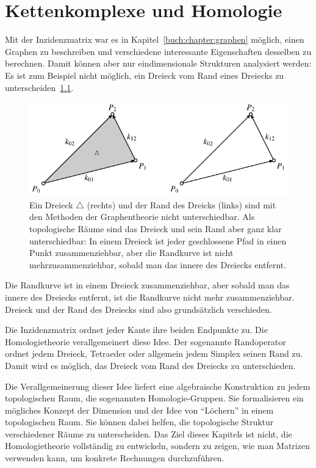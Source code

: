 %
%
%
\chapter{Kettenkomplexe und Homologie
\label{buch:chapter:homologie}}
\rhead{}
Mit der Inzidenzmatrix war es in Kapitel~\ref{buch:chapter:graphen}
möglich, einen Graphen zu beschreiben
und verschiedene interessante Eigenschaften desselben zu berechnen.
Damit können aber nur eindimensionale Strukturen analysiert werden:
Es ist zum Beispiel nicht möglich, ein Dreieck vom Rand eines
Dreiecks zu unterscheiden~\ref{buch:homologie:figure:zusammenziehbar}.
\begin{figure}
\centering
\includegraphics{chapters/95-homologie/images/dreieck.pdf}
\caption{Ein Dreieck $\triangle$ (rechts) und der Rand des Dreicks
(links) sind mit den Methoden
der Graphentheorie nicht unterschiedbar. 
Als topologische Räume sind das Dreieck und sein Rand aber ganz klar
unterschiedbar: In einem Dreieck ist jeder geschlossene Pfad in einen 
Punkt zusammenziehbar, aber die Randkurve ist nicht mehrzusammenziehbar,
sobald man das innere des Dreiecks entfernt.
\label{buch:homologie:figure:zusammenziehbar}}
\end{figure}
Die Randkurve ist in einem Dreieck zusammenziehbar, aber sobald man
das innere des Dreiecks entfernt, ist die Randkurve nicht mehr
zusammenziehbar.
Dreieck und der Rand des Dreiecks sind also grundsätzlich verschieden.

Die Inzidenzmatrix ordnet jeder Kante ihre beiden Endpunkte zu.
Die Homologietheorie verallgemeinert diese Idee.
Der sogenannte Randoperator ordnet jedem Dreieck, Tetraeder oder allgemein
jedem Simplex seinen Rand zu.
Damit wird es möglich, das Dreieck vom Rand des Dreiecks zu unterschieden.

Die Verallgemeinerung dieser Idee liefert eine algebraische Konstruktion
zu jedem topologischen Raum, die sogenannten Homologie-Gruppen.
Sie formalisieren ein mögliches Konzept der Dimension und der
Idee von ``Löchern'' in einem topologischen Raum.
Sie können dabei helfen, die topologische Struktur verschiedener
Räume zu unterscheiden.
Das Ziel dieses Kapitels ist nicht, die Homologietheorie 
vollständig zu entwickeln, sondern zu zeigen, wie man Matrizen
verwenden kann, um konkrete Rechnungen durchzuführen.




%








